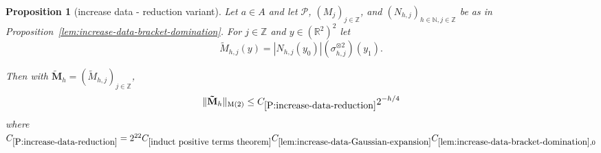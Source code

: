 \documentclass[12pt,reqno]{amsart}
\theoremstyle{plain}
\newtheorem{proposition}[theorem]{Proposition}
\numberwithin{equation}{section}
\theoremstyle{remark}
\newcommand{\using}[1]{}
\newcommand{\Z}{{\mathbb Z}}
\newcommand{\R}{{\mathbb R}}
\newcommand{\N}{{\mathbb N}}
\begin{document}
\begin{proposition}[increase data - reduction variant]
\label{P:increase-data-reduction}\using{lem:N-reduction}\using{square root Gaussian difference W0}\using{tensor Wiener}\using{lem:increase-data-Gaussian-expansion}\using{induct positive terms theorem}\using{Monotonicity K}\using{prism BL inequality}\using{lem:increase-data-bracket-domination}
Let $a\in A$ and let $\mathcal P$, $(M_j)_{j\in \Z}$, and $(N_{h,j})_{h\in\N,j\in\Z}$ be as in Proposition~\ref{lem:increase-data-bracket-domination}.
 For $j\in \Z$ and $y\in (\R^2)^2$ let
    \begin{equation}\label{auto:increase-data-majorant-kernel}\tilde{M}_{h,j}(y) = |N_{h,j}(y_0)| (\sigma_{h,j}^{\otimes2})(y_1). \end{equation}

Then with $\mathbf{\tilde{M}}_h=(\tilde{M}_{h,j})_{j\in \Z}$,
    \begin{equation}\label{auto:increase-data-majorant-bound}\|\mathbf{\tilde{M}}_h\|_{\rm M(2)}\le C_{\ref{P:increase-data-reduction}} 2^{-h/4}\end{equation}
    where $C_{\ref{P:increase-data-reduction}} = 2^{22}C_{\ref{induct positive terms theorem}}C_{\ref{lem:increase-data-Gaussian-expansion}}C_{\ref{lem:increase-data-bracket-domination},0}$


\end{proposition}
\end{document}

